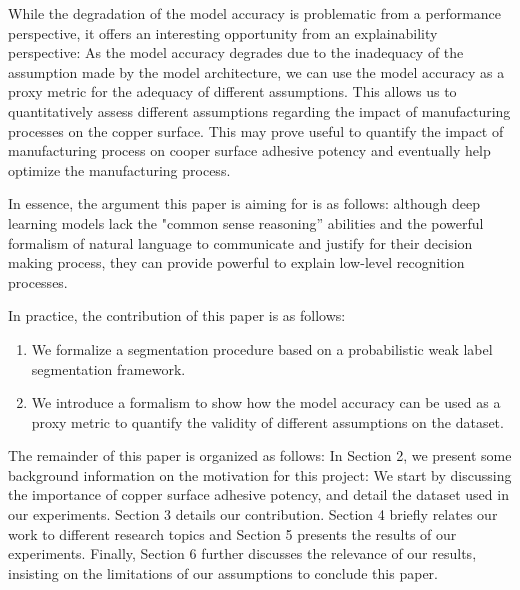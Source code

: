 \documentclass[10pt,twocolumn,letterpaper]{article}
\begin{document}
While the degradation of the model accuracy is problematic from a performance perspective,
it offers an interesting opportunity from an explainability perspective:
As the model accuracy degrades due to the inadequacy of the assumption 
made by the model architecture,
we can use the model accuracy as a proxy metric 
for the adequacy of different assumptions.
This allows us to quantitatively assess different assumptions regarding the impact 
of manufacturing processes on the copper surface. 
This may prove useful to quantify the impact of manufacturing process on cooper surface adhesive potency
and eventually help optimize the manufacturing process.
	
In essence, the argument this paper is aiming for is as follows: although deep learning models 
lack the "common sense reasoning” abilities and the powerful formalism of natural language to communicate 
and justify for their decision making process, they can provide powerful to explain low-level recognition processes.
	
In practice, the contribution of this paper is as follows:
\begin{enumerate}
\item  We formalize a segmentation procedure based on a probabilistic weak label segmentation framework.
\item  We introduce a formalism to show how the model accuracy can be used as a proxy metric to quantify the validity of different assumptions on the dataset.
\end{enumerate}
	
The remainder of this paper is organized as follows:
In Section 2, we present some background information on the motivation for this project:
We start by discussing the importance of copper surface adhesive potency,
and detail the dataset used in our experiments. 
Section 3 details our contribution.
Section 4 briefly relates our work to different research topics 
and Section 5 presents the results of our experiments.
Finally, Section 6 further discusses the relevance of our results, insisting on the limitations of our assumptions to conclude this paper.
	
\end{document}
